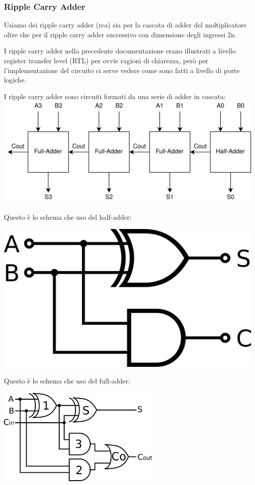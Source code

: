 \documentclass[12pt, letterpaper]{article}
\begin{document}
\subsubsection{Ripple Carry Adder}

Usiamo dei ripple carry adder (rca) sia per la cascata di adder del moltiplicatore oltre che per il ripple carry adder successivo con dimensione degli ingressi 2n.

I ripple carry adder nella precedente documentazione erano illustrati a livello register transfer level (RTL) per ovvie ragioni di chiarezza, però per l'implementazione del circuito ci serve vedere come sono fatti a livello di porte logiche.  

I ripple carry adder sono circuiti formati da una serie di adder in cascata:
\includegraphics[width=\textwidth]{ripple_carry_adder}

Questo è lo schema che uso del half-adder:
\begin{center}
\includegraphics{half_adder}
\end{center}

Questo è lo schema che uso del full-adder:
\begin{center}
\includegraphics[width=8cm]{full_adder}
\end{center}
\end{document}
